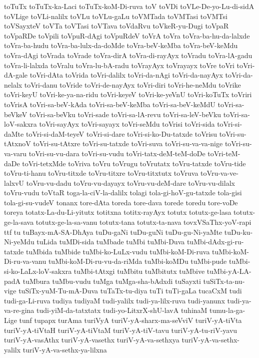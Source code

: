 {toTuTx
toTuTx-ka-Laci
toTuTx-koM-Di-ruva
toV
toVDi
toVLe-De-yo-Lu-di-sidA
toVLige
toVLi-nalilx
toVLu
toVLu-gaLu
toVMTada
toVMTasi
toVMTsi
toVSayxteV
toVTa
toVTasi
toVTava
toVdaRvu
toVkeR-yu-Dugi
toVpaR
toVpaRDe
toVpili
toVpuR-dAgi
toVpuRdeV
toVrA
toVra
toVra-ba-hu-da-lalxde
toVra-ba-hudu
toVra-ba-lulx-da-doMde
toVra-beV-keMba
toVra-beV-keMdu
toVra-dAgi
toVrada
toVrade
toVra-dirA
toVra-di-rayAyx
toVradu
toVra-lA-gadu
toVra-li-lalxda
toVralu
toVra-lu-bA-radu
toVrayAyx
toVrayayx
toVre
toVri
toVri-dA-gale
toVri-dAta
toVrida
toVri-dalilx
toVri-da-nAgi
toVri-da-nayAyx
toVri-da-nelalx
toVri-danu
toVride
toVri-de-nayAyx
toVri-diri
toVri-he-neMdu
toVrike
toVri-keyU
toVri-ke-ya-na-ridu
toVri-keyeV
toVri-ke-yeVnU
toVri-koTuTx
toVriri
toVrisA
toVri-sa-beV-kAda
toVri-sa-beV-keMba
toVri-sa-beV-keMdU
toVri-sa-beVkeV
toVri-sa-beVku
toVri-sade
toVri-sa-lA-revu
toVri-sa-leV-beVku
toVri-sa-loV-sakxra
toVri-sayAyx
toVri-sayayx
toVri-seMdu
toVrisi
toVri-sida
toVri-si-daMte
toVri-si-daM-teyeV
toVri-si-dare
toVri-si-ko-Du-tatxde
toVrisu
toVri-su-tAtxnoV
toVri-su-tAtxre
toVri-su-tatxde
toVri-suva
toVri-su-va-va-nige
toVri-su-va-varu
toVri-su-vu-dara
toVri-su-vudu
toVri-tatx-deM-teM-doDe
toVri-teM-daDe
toVri-tetxMde
toVriva
toVru
toVrugu
toVrutatx
toVru-tatxde
toVru-tide
toVru-ti-hanu
toVru-titxde
toVru-titxre
toVru-titxtutx
toVruva
toVru-va-ve-lalxvU
toVru-vu-dadu
toVru-vu-dayayx
toVru-vu-deM-dare
toVru-vu-dilalx
toVru-vudu
toVtaR
toga-la-ciV-la-dalilx
tolagi
tola-gi-hoV-gu-tatxde
tola-gisi
tola-gi-su-vudeV
tonanx
tore-dAta
toreda
tore-dava
torede
toredu
tore-voDe
toreya
totatx-La-du-Li-yitutx
totitxna
totitx-rayAyx
totutx
totutx-ge-lasa
totutx-ge-la-sava
totutx-ge-la-sa-vanu
totutx-tana
totutx-ta-nava
tovxVSaThx-yoV-rapi
ttf
tu
tuBayx-mA-SA-DhAya
tuDu-gaNi
tuDu-guNi
tuDu-gu-Ni-yaMte
tuDu-ku-Ni-yeMdu
tuLida
tuMDi-sida
tuMbade
tuMbi
tuMbi-Duva
tuMbi-dAdx-gi-ru-tatxde
tuMbida
tuMbide
tuMbi-ko-LuLx-vudu
tuMbi-koM-Di-ruva
tuMbi-koM-Di-ru-va-vanu
tuMbi-koM-Di-ru-vu-da-riMda
tuMbi-koMDu
tuMbi-pude
tuMbi-si-ko-LaLx-loV-sakxra
tuMbi-tAtxgi
tuMbitu
tuMbitutx
tuMbive
tuMbi-yA-LA-padA
tuMbura
tuMbu-vudu
tuMga
tuMga-sha-bAdxdi
tuSayxti
tuSiTx-ta-nu-vige
tuSiTx-yuM-Tu-mA-Duva
tuTaTx-tu-diya
tuTi
tuTi-gaLa
tucaCxM
tudi
tudi-ga-Li-ruva
tudiya
tudiyaM
tudi-yalilx
tudi-ya-lilx-ruva
tudi-yanunx
tudi-ya-va-re-gina
tudi-yiM-da-tatxtatx
tudi-yo-LitxrX-shU-lavA
tuhinaM
tumu-la-ga-Lige
tunf
tupapx
turAma
turiVyA
turiV-yA-sharx-ma-seVviV
turiV-yA-tiVta
turiV-yA-tiVtaH
turiV-yA-tiVtaM
turiV-yA-tiV-tavu
turiV-yA-tu-riV-yavu
turiV-yA-vasAthx
turiV-yA-vasethx
turiV-yA-va-sethxya
turiV-yA-va-sethx-yalilx
turiV-yA-va-sethx-ya-lilxna
}

